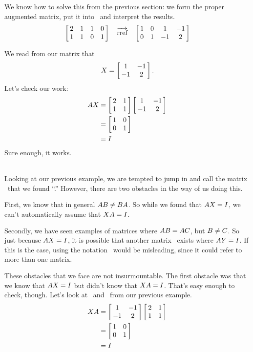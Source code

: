{We know how to solve this from the previous section: we form the proper augmented matrix, put it into \rref\ and interpret the results. 
$$\bmx{cccc}2&1&1&0\\1&1&0&1\emx \quad \arref \quad \bmx{cccc}1&0&1&-1\\0&1&-1&2\emx$$

We read from our matrix that $$\ttx = \bmx{cc}1&-1\\-1&2\emx.$$ Let's check our work:
\begin{align*}
	\tta\ttx & = \bmx{cc}2&1\\1&1\emx\bmx{cc}1&-1\\-1&2\emx \\
					& = \bmx{cc}1&0\\0&1\emx\\
					& = \tti
\end{align*}
Sure enough, it works.}\\ %

Looking at our previous example, we are tempted to jump in and call the matrix \ttx\ that we found ``\ttai.'' However, there are two obstacles in the way of us doing this. 

First, we know that in general $\tta\ttb \neq \ttb\tta$. So while we found that $\tta\ttx = \tti$, we can't automatically assume that $\ttx\tta=\tti$.

Secondly, we have seen examples of matrices where $\tta\ttb = \tta\ttc$, but $\ttb\neq\ttc$. So just because $\tta\ttx = \tti$, it is possible that another matrix \tty\ exists where $\tta\tty = \tti$. If this is the case, using the notation \ttai\ would be misleading, since it could refer to more than one matrix.

These obstacles that we face are not insurmountable. The first obstacle was that we know that $\tta\ttx=\tti$ but didn't know that $\ttx\tta=\tti$. That's easy enough to check, though. Let's look at \tta\ and \ttx\ from our previous example.
\begin{align*}
\ttx\tta &= \bmx{cc}1&-1\\-1&2\emx\bmx{cc}2&1\\1&1\emx \\
					&=\bmx{cc}1&0\\0&1\emx\\
					&=\tti
\end{align*}

